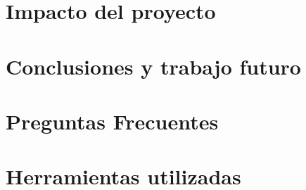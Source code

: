 \chapter{Impacto del proyecto}
\label{sec:cap5}


\chapter{Conclusiones y trabajo futuro}
\label{sec:cap6}


\label{sec:bibliografía}
\printbibliography

\appendix
\label{sec:apendice}
\chapter{Preguntas Frecuentes}

\chapter{Herramientas utilizadas}





